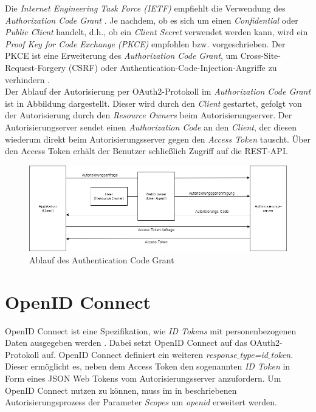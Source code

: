 Die \textit{Internet Engineering Task Force (IETF)} empfiehlt die Verwendung des \textit{Authorization Code Grant} \cite[Unterabschnitt~2.1.1]{ietf-oauth-security-topics-18}. 
Je nachdem, ob es sich um einen \textit{Confidential} oder \textit{Public Client} handelt, d.h., ob ein \textit{Client Secret} verwendet werden kann, wird ein \textit{Proof Key for Code Exchange (PKCE)} empfohlen bzw. vorgeschrieben. 
Der PKCE ist eine Erweiterung des \textit{Authorization Code Grant}, um Cross-Site-Request-Forgery (CSRF) oder Authentication-Code-Injection-Angriffe zu verhindern \cite{rfc7636}. \\

Der Ablauf der Autorisierung per OAuth2-Protokoll im \textit{Authorization Code Grant} ist in Abbildung  dargestellt. 
Dieser wird durch den \textit{Client} gestartet, gefolgt von der Autorisierung durch den \textit{Resource Owners} beim Autorisierungserver. 
Der Autorisierungserver sendet einen \textit{Authorization Code} an den \textit{Client}, der diesen wiederum direkt beim Autorisierungsserver gegen den \textit{Access Token} tauscht. Über den Access Token erhält der Benutzer schließlich Zugriff auf die REST-API.

\begin{figure}[htbp]
\centering
\includegraphics[width=\textwidth]{Authentication_Code_Grant.png}
\caption{Ablauf des Authentication Code Grant}
\label{fig:auth-code-grant}
\end{figure}

\section{OpenID Connect}
\label{auth:openid}

OpenID Connect ist eine Spezifikation, wie \textit{ID Tokens} mit personenbezogenen Daten ausgegeben werden \cite{OpenID.Core}. 
Dabei setzt OpenID Connect auf das OAuth2-Protokoll auf. 
OpenID Connect definiert ein weiteren \textit{response$\_$type=id$\_$token}. 
Dieser ermöglicht es, neben dem Access Token den sogenannten \textit{ID Token} in Form eines JSON Web Tokens \cite{7518} vom Autorisierungsserver anzufordern. 
Um OpenID Connect nutzen zu können, muss im in  beschriebenen Autorisierungsprozess der Parameter \textit{Scopes} um \textit{openid} erweitert werden. \\

